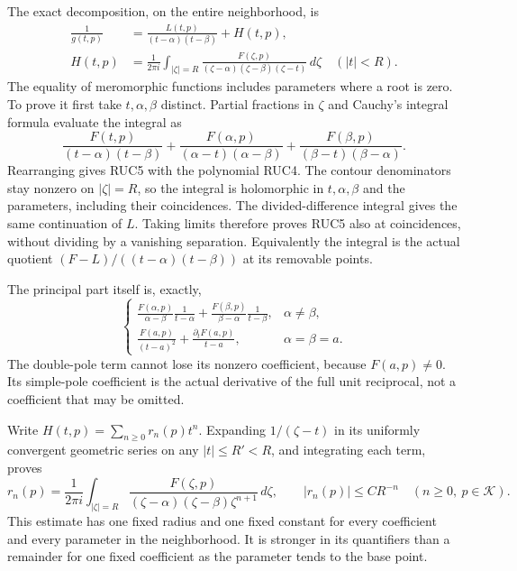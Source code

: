 \documentclass[11pt]{article}
\begin{document}
The exact decomposition, on the entire neighborhood, is
\[
 \begin{aligned}
 \frac1{g(t,p)}&=\frac{L(t,p)}{(t-\alpha)(t-\beta)}+H(t,p),\\
 H(t,p)&=\frac1{2\pi i}\int_{|\zeta|=R}
 \frac{F(\zeta,p)}{(\zeta-\alpha)(\zeta-\beta)(\zeta-t)}\,d\zeta
                    \quad(|t|<R).
 \end{aligned}\tag{RUC5}
\]
The equality of meromorphic functions includes parameters where a
root is zero.  To prove it first take $t,\alpha,\beta$ distinct.
Partial fractions in $\zeta$ and Cauchy's integral formula evaluate
the integral as
\[
 \frac{F(t,p)}{(t-\alpha)(t-\beta)}
 +\frac{F(\alpha,p)}{(\alpha-t)(\alpha-\beta)}
 +\frac{F(\beta,p)}{(\beta-t)(\beta-\alpha)}.
\]
Rearranging gives RUC5 with the polynomial RUC4.  The contour
denominators stay nonzero on $|\zeta|=R$, so the integral is
holomorphic in $t,\alpha,\beta$ and the parameters, including
their coincidences.  The divided-difference integral gives the
same continuation of $L$.  Taking limits therefore proves RUC5
also at coincidences, without dividing by a vanishing separation.
Equivalently the integral is the actual quotient
$(F-L)/((t-\alpha)(t-\beta))$ at its removable points.

The principal part itself is, exactly,
\[
 \begin{cases}
 \displaystyle
 \frac{F(\alpha,p)}{\alpha-\beta}\frac1{t-\alpha}
 +\frac{F(\beta,p)}{\beta-\alpha}\frac1{t-\beta},&\alpha\ne\beta,\\[6pt]
 \displaystyle \frac{F(a,p)}{(t-a)^2}
              +\frac{\partial_tF(a,p)}{t-a},&\alpha=\beta=a.
 \end{cases}\tag{RUC6}
\]
The double-pole term cannot lose its nonzero coefficient, because
$F(a,p)\ne0$.  Its simple-pole coefficient is the actual derivative
of the full unit reciprocal, not a coefficient that may be omitted.

Write $H(t,p)=\sum_{n\ge0}r_n(p)t^n$.
Expanding $1/(\zeta-t)$ in its uniformly convergent geometric
series on any $|t|\le R'<R$, and integrating each term, proves
\[
 r_n(p)=\frac1{2\pi i}\int_{|\zeta|=R}
     \frac{F(\zeta,p)}{(\zeta-\alpha)(\zeta-\beta)\zeta^{n+1}}\,d\zeta,
 \qquad |r_n(p)|\le C R^{-n}\quad(n\ge0,\ p\in\mathcal K).
 \tag{RUC7}
\]
This estimate has one fixed radius and one fixed constant for
every coefficient and every parameter in the neighborhood.
It is stronger in its quantifiers than a remainder for one fixed
coefficient as the parameter tends to the base point.
\end{document}
